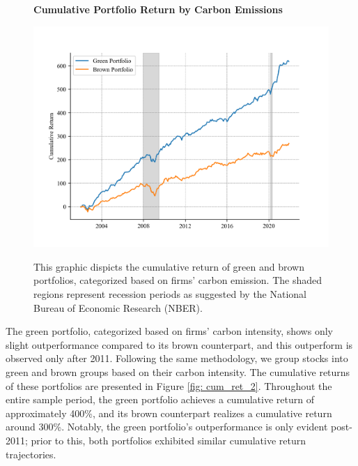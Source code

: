 \documentclass[12pt]{article}
\begin{document}
\begin{figure}[!ht]
\centering
\caption{\textbf{Cumulative Portfolio Return by Carbon Emissions}}
\includegraphics{graphics/green_brown_co2.png}
\label{fig: cum_ret_1}
\caption*{\footnotesize{This graphic dispicts the cumulative return of green and brown portfolios, categorized based on firms' carbon emission. The shaded regions represent recession periods as suggested by the National Bureau of Economic Research (NBER).}}
\end{figure}

The green portfolio, categorized based on firms' carbon intensity, shows only slight outperformance compared to its brown counterpart, and this outperform is observed only after 2011. Following the same methodology, we group stocks into green and brown groups based on their carbon intensity. The cumulative returns of these portfolios are presented in Figure \ref{fig: cum_ret_2}. Throughout the entire sample period, the green portfolio achieves a cumulative return of approximately 400\%, and its brown counterpart realizes a cumulative return around 300\%. Notably, the green portfolio's outperformance is only evident post-2011; prior to this, both portfolios exhibited similar cumulative return trajectories.
\end{document}
